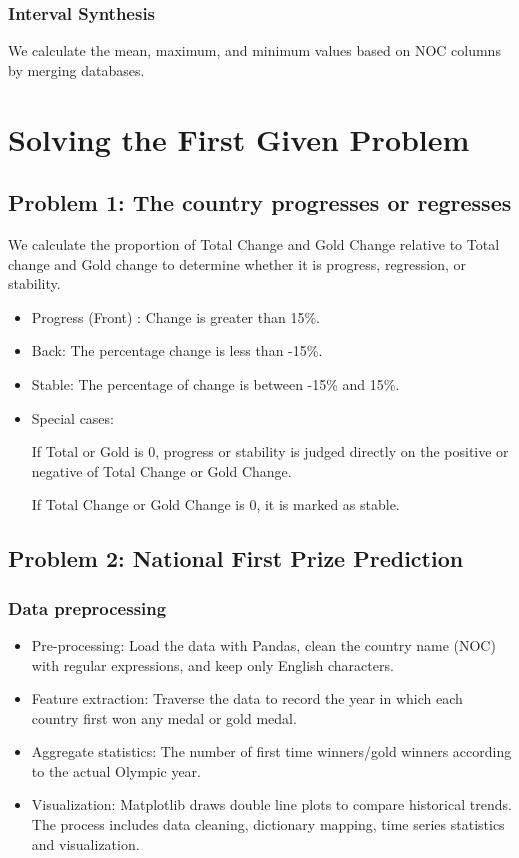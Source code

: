 \documentclass{mcmthesis}
\begin{document}
 \subsubsection{Interval Synthesis} 
 We calculate the mean, maximum, and minimum values based on NOC columns by merging databases.
 \section{Solving the First Given Problem} 
 \subsection{Problem 1: The country progresses or regresses} 
 We calculate the proportion of Total Change and Gold Change relative to Total change and Gold change to determine whether it is progress, regression, or stability.
 \begin{itemize}
  \item  Progress (Front) : Change is greater than 15\%.
  \item Back: The percentage change is less than -15\%.
  \item Stable: The percentage of change is between -15\% and 15\%.
  \item Special cases:
  
  If Total or Gold is 0, progress or stability is judged directly on the positive or negative of Total Change or Gold Change.
 
  If Total Change or Gold Change is 0, it is marked as stable.
  \end{itemize}
  \subsection{Problem 2: National First Prize Prediction} 
  \subsubsection{Data preprocessing} 
  \begin{itemize}
    \item Pre-processing: Load the data with Pandas, clean the country name (NOC) with regular expressions, and keep only English characters.
    \item Feature extraction: Traverse the data to record the year in which each country first won any medal or gold medal.
    \item Aggregate statistics: The number of first time winners/gold winners according to the actual Olympic year.
    \item Visualization: Matplotlib draws double line plots to compare historical trends. The process includes data cleaning, dictionary mapping, time series statistics and visualization.
  \end{itemize}
\end{document}
